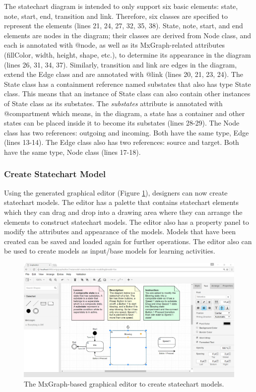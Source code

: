 \documentclass[10pt, a4paper]{report} \usepackage[titletoc]{appendix}
\begin{document}
The statechart diagram is intended to only support six basic elements: state, note, start, end, transition and link. Therefore, six classes are specified to represent the elements (lines 21, 24, 27, 32, 35, 38). State, note, start, and end elements are nodes in the diagram; their classes are derived from Node class, and each is annotated with {\selectfont @node}, as well as its MxGraph-related attributes (fillColor, width, height, shape, etc.), to determine its appearance in the diagram (lines 26, 31, 34, 37). Similarly, transition and link are edges in the diagram, extend the Edge class and are annotated with {\selectfont @link} (lines 20, 21, 23, 24). The State class has a containment reference named substates that also has type State class. This means that an instance of State class can also contain other instances of State class as its substates. The \emph{substates} attribute is annotated with {\selectfont @compartment} which means, in the diagram, a state has a container and other states can be placed inside it to become its substates (lines 28-29). The Node class has two references: outgoing and incoming. Both have the same type, Edge (lines 13-14). The Edge class also has two references: source and target. Both have the same type, Node class (lines 17-18).



\subsubsection{Create Statechart Model}
Using the generated graphical editor (Figure \ref{ide}), designers can now create statechart models. The editor has a palette that contains statechart elements which they can drag and drop into a drawing area where they can arrange the elements to construct statechart models. The editor also has a property panel to modify the attributes and appearance of the models. Models that have been created can be saved and loaded again for further operations. The editor also can be used to create models as input/base models for learning activities. 

\begin{figure}[t!]
\centering
\includegraphics[width=12cm]{ide}
\caption{The MxGraph-based graphical editor to create statechart models.}
\label{ide}
\end{figure}
\end{document}
